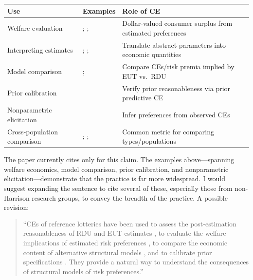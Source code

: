 \documentclass[12pt,a4paper]{article}
\begin{document}
\begin{tabular}{p{4cm} p{5cm} p{5cm}}
\toprule
\textbf{Use} & \textbf{Examples} & \textbf{Role of CE} \\
\midrule
Welfare evaluation & \textcite{Harrison2016}; \textcite{Gao2022};
  \textcite{Barseghyan2013} &
  Dollar-valued consumer surplus from estimated preferences \\[6pt]
Interpreting estimates & \textcite{HarrisonRutstrom2008};
  \textcite{HarrisonSwarthout2023}; \textcite{LauYoo2025} &
  Translate abstract parameters into economic quantities \\[6pt]
Model comparison & \textcite{HarrisonSwarthout2023}; \textcite{LauYoo2025} &
  Compare CEs/risk premia implied by EUT vs.\ RDU \\[6pt]
Prior calibration & \textcite{Bland2025} &
  Verify prior reasonableness via prior predictive CE \\[6pt]
Nonparametric elicitation & \textcite{Abdellaoui2000} &
  Infer preferences from observed CEs \\[6pt]
Cross-population comparison & \textcite{BruhinFehrDudaEpper2010};
  \textcite{Tanaka2010}; \textcite{vonGaudecker2011} &
  Common metric for comparing types/populations \\
\bottomrule
\end{tabular}

\vspace{1em}

The paper currently cites only \textcite{Harrison2022} for this claim. The
examples above---spanning welfare economics, model comparison, prior
calibration, and nonparametric elicitation---demonstrate that the practice is
far more widespread. I would suggest expanding the sentence to cite several of
these, especially those from non-Harrison research groups, to convey the
breadth of the practice. A possible revision:

\begin{quote}
``CEs of reference lotteries have been used to assess the post-estimation
reasonableness of RDU and EUT estimates
\parencite[807]{Harrison2022}, to evaluate the welfare
implications of estimated risk preferences
\parencite{Harrison2016, Gao2022, Barseghyan2013}, to compare the
economic content of alternative structural models
\parencite{HarrisonSwarthout2023, LauYoo2025}, and to calibrate
prior specifications \parencite{Bland2025}. They provide a natural way to
understand the consequences of structural models of risk preferences.''
\end{quote}

\printbibliography
\end{document}
